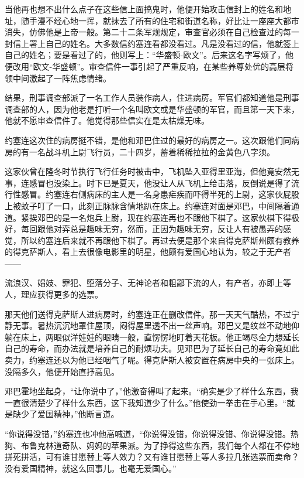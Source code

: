 当他再也想不出什么点子在这些信上面搞鬼时，他便开始攻击信封上的姓名和地址，随手漫不经心地一挥，就抹去了所有的住宅和街道名称，好比让一座座大都市消失，仿佛他是上帝一般。第二十二条军规规定，审查官必须在自己检查过的每一封信上署上自己的姓名。大多数信约塞连看都没看过。凡是没看过的信，他就签上自己的姓名；要是看过了的，他则写上：“华盛顿-欧文”。后来这名字写烦了，他便改用“欧文-华盛顿”。审查信件一事引起了严重反响，在某些养尊处优的高层将领中间激起了一阵焦虑情绪。




结果，刑事调查部派了一名工作人员装作病人，住进病房。军官们都知道他是刑事调查部的人，因为他老是打听一个名叫欧文或是华盛顿的军官，而且第一天下来，他就不愿审查信件了。他觉得那些信实在是太枯燥无味。

约塞连这次住的病房挺不错，是他和邓巴住过的最好的病房之一。这次跟他们同病房的有一名战斗机上尉飞行员，二十四岁，蓄着稀稀拉拉的金黄色八字须。

这家伙曾在隆冬时节执行飞行任务时被击中，飞机坠入亚得里亚海，但他竟安然无事，连感冒也没染上。时下已是夏天，他没让人从飞机上给击落，反倒说是得了流行性感冒。约塞连右侧病床的主人是一名身患疟疾而吓得半死的上尉，这家伙屁股上被蚊子叮了一口，此刻正脉脉含情地趴在床上。约塞连对面是邓巴，中间隔着通道。紧挨邓巴的是一名炮兵上尉，现在约塞连再也不跟他下棋了。这家伙棋下得极好，每回跟他对弈总是趣味无穷，然而，正因为趣味无穷，反让人有被愚弄的感觉，所以约塞连后来就不再跟他下棋了。再过去便是那个来自得克萨斯州颇有教养的得克萨斯人，看上去很像电影里的明星，他颇有爱国心地认为，较之于无产者——

流浪汉、娼妓、罪犯、堕落分子、无神论者和粗鄙下流的人，有产者，亦即上等人，理应获得更多的选票。

那天他们送得克萨斯人进病房时，约塞连正在删改信件。那一天天气酷热，不过宁静无事。暑热沉沉地罩住屋顶，闷得屋里透不出一丝声响。邓巴又是纹丝不动地仰躺在床上，两眼似洋娃娃的眼睛一般，直愣愣地盯着天花板。他正竭尽全力想延长自己的寿命，而办法就是培养自己的耐烦功夫。见邓巴为了延长自己的寿命竟如此卖力，约塞连还以为他已经咽气了呢。得克萨斯人被安置在病房中央的一张床上。没隔多久，他便开始直抒高见。

邓巴霍地坐起身，“让你说中了，”他激奋得叫了起来。“确实是少了样什么东西，我一直很清楚少了样什么东西，这下我知道少了什么。”他使劲一拳击在手心里。“就是缺少了爱国精神，”他断言道。




“你说得没错，”约塞连也冲他高喊道，“你说得没错，你说得没错、你说得没错。热狗、布鲁克林道奇队、妈妈的苹果派。为了挣得这些东西，我们每个人都在不停地拼死拼活，可有谁甘愿替上等人效力？又有谁甘愿替上等人多拉几张选票而卖命？没有爱国精神，就这么回事儿。也毫无爱国心。”

